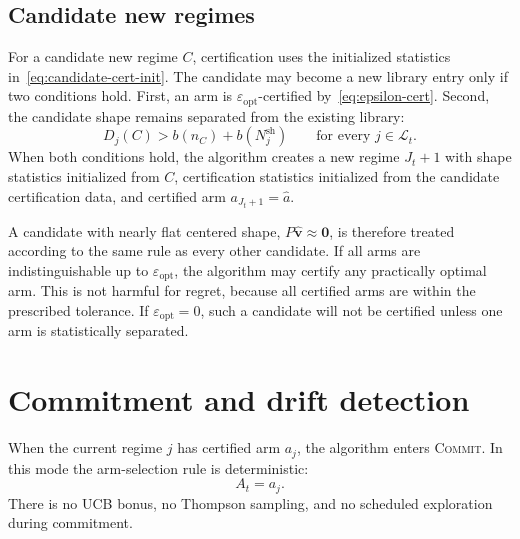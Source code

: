 \documentclass[11pt]{article}
\newcommand{\Lcal}{\mathcal L}
\newcommand{\COMMIT}{\textsc{Commit}\xspace}
\begin{document}
\subsection{Candidate new regimes}

For a candidate new regime $C$, certification uses the initialized statistics in~\eqref{eq:candidate-cert-init}. The candidate may become a new library entry only if two conditions hold. First, an arm is $\varepsilon_{\mathrm{opt}}$-certified by~\eqref{eq:epsilon-cert}. Second, the candidate shape remains separated from the existing library:
\begin{equation}
    D_j(C)>b(n_C)+b(N_j^{\mathrm{sh}})
    \qquad
    \text{for every }j\in\Lcal_t.
    \label{eq:candidate-separated}
\end{equation}
When both conditions hold, the algorithm creates a new regime $J_t+1$ with shape statistics initialized from $C$, certification statistics initialized from the candidate certification data, and certified arm $a_{J_t+1}=\widehat a$.

A candidate with nearly flat centered shape, $P\widehat{\bm v}\approx\bm 0$, is therefore treated according to the same rule as every other candidate. If all arms are indistinguishable up to $\varepsilon_{\mathrm{opt}}$, the algorithm may certify any practically optimal arm. This is not harmful for regret, because all certified arms are within the prescribed tolerance. If $\varepsilon_{\mathrm{opt}}=0$, such a candidate will not be certified unless one arm is statistically separated.

\section{Commitment and drift detection}

When the current regime $j$ has certified arm $a_j$, the algorithm enters \COMMIT. In this mode the arm-selection rule is deterministic:
\begin{equation}
    A_t=a_j.
    \label{eq:commit}
\end{equation}
There is no UCB bonus, no Thompson sampling, and no scheduled exploration during commitment.
\end{document}
